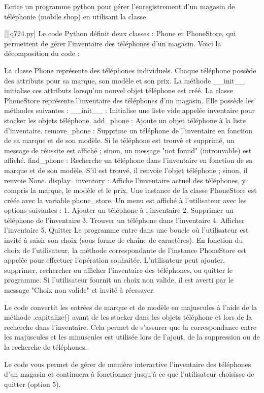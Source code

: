         \question
        Ecrire un programme python pour gérer l'enregistrement d'un magasin de téléphonie (mobile shop) en utilisant la classe
        \par
        \begin{solution}
            \renewcommand{\nomfichier}{q724.py}
            \pythonfile{\chemincode \nomfichier}[][\nomfichier]
            Le code Python définit deux classes : Phone et PhoneStore, qui permettent de gérer l'inventaire des téléphones d'un magasin. Voici la décomposition du code :

    La classe Phone représente des téléphones individuels. Chaque téléphone possède des attributs pour sa marque, son modèle et son prix. La méthode __init__ initialise ces attributs lorsqu'un nouvel objet téléphone est créé.
    La classe PhoneStore représente l'inventaire des téléphones d'un magasin. Elle possède les méthodes suivantes :
        __init__ : Initialise une liste vide appelée inventaire pour stocker les objets téléphone.
        add_phone : Ajoute un objet téléphone à la liste d'inventaire.
        remove_phone : Supprime un téléphone de l'inventaire en fonction de sa marque et de son modèle. Si le téléphone est trouvé et supprimé, un message de réussite est affiché ; sinon, un message "not found" (introuvable) est affiché.
        find_phone : Recherche un téléphone dans l'inventaire en fonction de sa marque et de son modèle. S'il est trouvé, il renvoie l'objet téléphone ; sinon, il renvoie None.
        display_inventory : Affiche l'inventaire actuel des téléphones, y compris la marque, le modèle et le prix.
    Une instance de la classe PhoneStore est créée avec la variable phone_store.
    Un menu est affiché à l'utilisateur avec les options suivantes :
        1. Ajouter un téléphone à l'inventaire
        2. Supprimer un téléphone de l'inventaire
        3. Trouver un téléphone dans l'inventaire
        4. Afficher l'inventaire
        5. Quitter
    Le programme entre dans une boucle où l'utilisateur est invité à saisir son choix (sous forme de chaîne de caractères).
    En fonction du choix de l'utilisateur, la méthode correspondante de l'instance PhoneStore est appelée pour effectuer l'opération souhaitée. L'utilisateur peut ajouter, supprimer, rechercher ou afficher l'inventaire des téléphones, ou quitter le programme.
    Si l'utilisateur fournit un choix non valide, il est averti par le message "Choix non valide" et invité à réessayer.

Le code convertit les entrées de marque et de modèle en majuscules à l'aide de la méthode .capitalize() avant de les stocker dans les objets téléphone et lors de la recherche dans l'inventaire. Cela permet de s'assurer que la correspondance entre les majuscules et les minuscules est utilisée lors de l'ajout, de la suppression ou de la recherche de téléphones.

Le code vous permet de gérer de manière interactive l'inventaire des téléphones d'un magasin et continuera à fonctionner jusqu'à ce que l'utilisateur choisisse de quitter (option 5).
        \end{solution}
        


